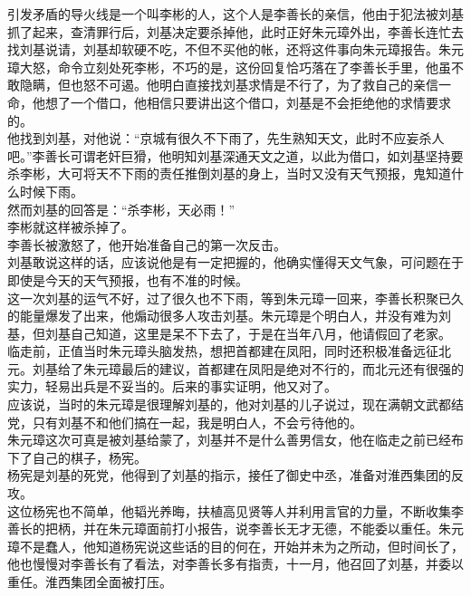 \begin{multicols}{\theparacolNo}
引发矛盾的导火线是一个叫李彬的人，这个人是李善长的亲信，他由于犯法被刘基抓了起来，查清罪行后，刘基决定要杀掉他，此时正好朱元璋外出，李善长连忙去找刘基说请，刘基却软硬不吃，不但不买他的帐，还将这件事向朱元璋报告。朱元璋大怒，命令立刻处死李彬，不巧的是，这份回复恰巧落在了李善长手里，他虽不敢隐瞒，但也怒不可遏。他明白直接找刘基求情是不行了，为了救自己的亲信一命，他想了一个借口，他相信只要讲出这个借口，刘基是不会拒绝他的求情要求的。\\

他找到刘基，对他说：“京城有很久不下雨了，先生熟知天文，此时不应妄杀人吧。”李善长可谓老奸巨猾，他明知刘基深通天文之道，以此为借口，如刘基坚持要杀李彬，大可将天不下雨的责任推倒刘基的身上，当时又没有天气预报，鬼知道什么时候下雨。\\

然而刘基的回答是：“杀李彬，天必雨！”\\

李彬就这样被杀掉了。\\

李善长被激怒了，他开始准备自己的第一次反击。\\

刘基敢说这样的话，应该说他是有一定把握的，他确实懂得天文气象，可问题在于即使是今天的天气预报，也有不准的时候。\\

这一次刘基的运气不好，过了很久也不下雨，等到朱元璋一回来，李善长积聚已久的能量爆发了出来，他煽动很多人攻击刘基。朱元璋是个明白人，并没有难为刘基，但刘基自己知道，这里是呆不下去了，于是在当年八月，他请假回了老家。\\

临走前，正值当时朱元璋头脑发热，想把首都建在凤阳，同时还积极准备远征北元。刘基给了朱元璋最后的建议，首都建在凤阳是绝对不行的，而北元还有很强的实力，轻易出兵是不妥当的。后来的事实证明，他又对了。\\

应该说，当时的朱元璋是很理解刘基的，他对刘基的儿子说过，现在满朝文武都结党，只有刘基不和他们搞在一起，我是明白人，不会亏待他的。\\

朱元璋这次可真是被刘基给蒙了，刘基并不是什么善男信女，他在临走之前已经布下了自己的棋子，杨宪。\\

杨宪是刘基的死党，他得到了刘基的指示，接任了御史中丞，准备对淮西集团的反攻。\\

这位杨宪也不简单，他韬光养晦，扶植高见贤等人并利用言官的力量，不断收集李善长的把柄，并在朱元璋面前打小报告，说李善长无才无德，不能委以重任。朱元璋不是蠢人，他知道杨宪说这些话的目的何在，开始并未为之所动，但时间长了，他也慢慢对李善长有了看法，对李善长多有指责，十一月，他召回了刘基，并委以重任。淮西集团全面被打压。\\


\end{multicols}
